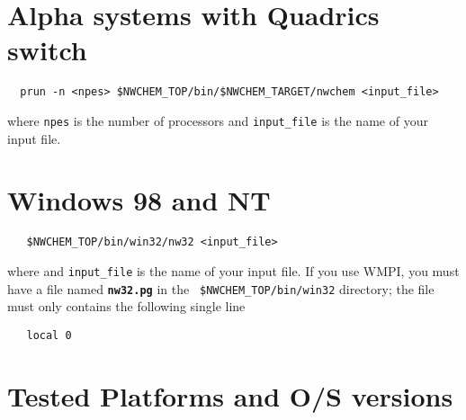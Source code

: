 \section{Alpha systems with Quadrics switch}

\begin{verbatim}
  prun -n <npes> $NWCHEM_TOP/bin/$NWCHEM_TARGET/nwchem <input_file>
\end{verbatim}

where \verb+npes+ is the number of processors and \verb+input_file+ is the
name of your input file.

\section{Windows 98 and NT}

\begin{verbatim}
   $NWCHEM_TOP/bin/win32/nw32 <input_file>
\end{verbatim}

where  and \verb+input_file+ is the
name of your input file. 
If you use WMPI, you must have a file named {\bf \tt nw32.pg} in the
\verb+ $NWCHEM_TOP/bin/win32+ directory; the file must only contains the 
following single line
\begin{verbatim}
   local 0
\end{verbatim}



\section{Tested Platforms and O/S versions}

